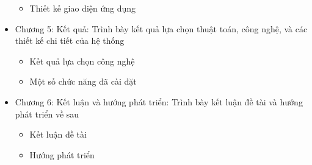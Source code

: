 \begin{itemize}
\begin{itemize}
              \item Thiết kế giao diện ứng dụng
          \end{itemize}
    \item Chương 5: Kết quả: Trình bày kết quả lựa chọn thuật toán, công nghệ, và các thiết kế chi tiết của hệ thống
          \begin{itemize}
              \item Kết quả lựa chọn công nghệ
              \item Một số chức năng đã cài đặt
          \end{itemize}
    \item Chương 6: Kết luận và hướng phát triển: Trình bày kết luận đề tài và hướng phát triển về sau
          \begin{itemize}
              \item Kết luận đề tài
              \item Hướng phát triển
          \end{itemize}
\end{itemize}